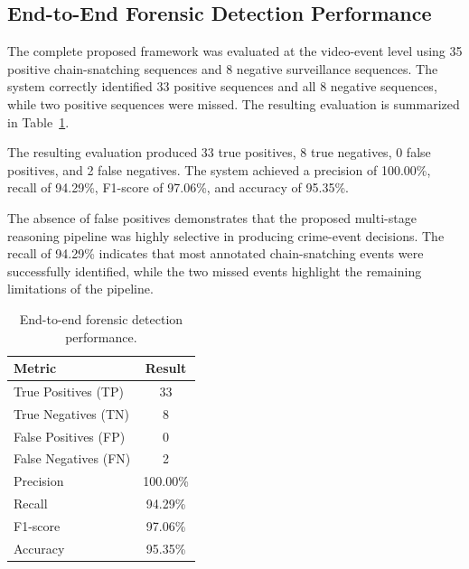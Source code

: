 \documentclass[conference]{IEEEtran}
\begin{document}
\subsection{End-to-End Forensic Detection Performance}

The complete proposed framework was evaluated at the video-event level
using 35 positive chain-snatching sequences and 8 negative surveillance
sequences. The system correctly identified 33 positive sequences and all
8 negative sequences, while two positive sequences were missed. The
resulting evaluation is summarized in Table~\ref{tab:end_to_end_performance}.

The resulting evaluation produced 33 true positives, 8 true negatives,
0 false positives, and 2 false negatives. The system achieved a
precision of 100.00\%, recall of 94.29\%, F1-score of 97.06\%, and
accuracy of 95.35\%.

The absence of false positives demonstrates that the proposed
multi-stage reasoning pipeline was highly selective in producing
crime-event decisions. The recall of 94.29\% indicates that most
annotated chain-snatching events were successfully identified, while
the two missed events highlight the remaining limitations of the
pipeline.

\begin{table}[H]
\centering
\caption{End-to-end forensic detection performance.}
\label{tab:end_to_end_performance}
\begin{tabular}{lc}
\hline
\textbf{Metric} & \textbf{Result} \\
\hline
True Positives (TP) & 33 \\
True Negatives (TN) & 8 \\
False Positives (FP) & 0 \\
False Negatives (FN) & 2 \\
Precision & 100.00\% \\
Recall & 94.29\% \\
F1-score & 97.06\% \\
Accuracy & 95.35\% \\
\hline
\end{tabular}
\end{table}
\end{document}
